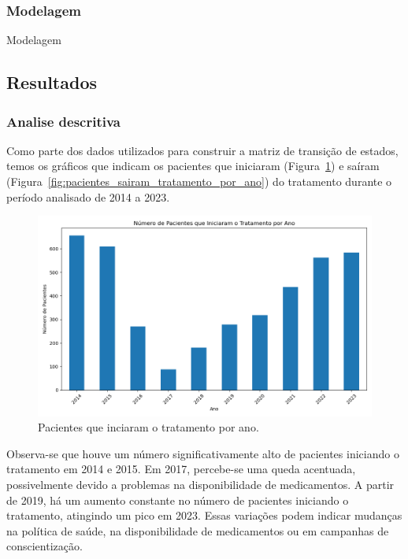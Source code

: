 \documentclass[article,a4paper,12pt,brazil,sumario=tradicional]{abntex2}
\begin{document}
\subsubsection{Modelagem}

Modelagem

\subsection{Resultados}

\subsubsection{Analise descritiva}

Como parte dos dados utilizados para construir a matriz de transição de estados, temos os gráficos que indicam os pacientes que iniciaram (Figura~\ref{fig:pacientes_iniciaram_tratamento_por_ano}) e saíram (Figura~\ref{fig:pacientes_sairam_tratamento_por_ano}) do tratamento durante o período analisado de 2014 a 2023.

\begin{figure}[!ht]
    \centering
    \includegraphics[width=1\textwidth]{pacientes_iniciaram_tratamento_por_ano.png}
    \caption{Pacientes que inciaram o tratamento por ano.}
    \label{fig:pacientes_iniciaram_tratamento_por_ano}
\end{figure}

Observa-se que houve um número significativamente alto de pacientes iniciando o tratamento em 2014 e 2015. Em 2017, percebe-se uma queda acentuada, possivelmente devido a problemas na disponibilidade de medicamentos. A partir de 2019, há um aumento constante no número de pacientes iniciando o tratamento, atingindo um pico em 2023. Essas variações podem indicar mudanças na política de saúde, na disponibilidade de medicamentos ou em campanhas de conscientização.
\end{document}
